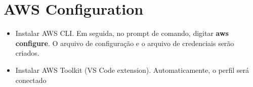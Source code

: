 \section{AWS Configuration}
\begin{itemize}
    \item Instalar AWS CLI. Em seguida, no prompt de comando, digitar \textbf{aws configure}. O arquivo de configuração e o arquivo de credenciais serão criados.
    \item Instalar AWS Toolkit (VS Code extension). Automaticamente, o perfil será conectado
    
\end{itemize}
